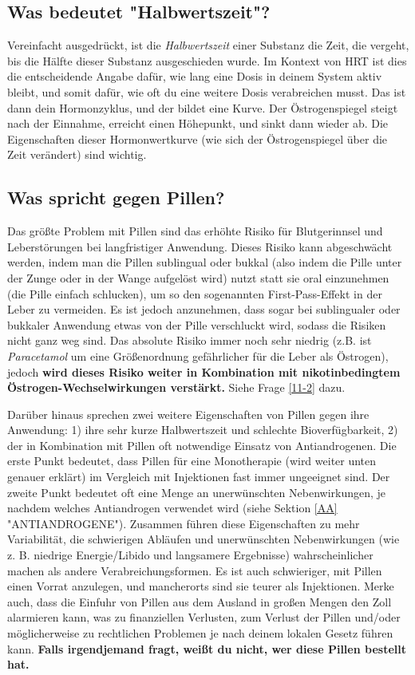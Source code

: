 \documentclass{article}
\begin{document}
\subsection{Was bedeutet "Halbwertszeit"?}

Vereinfacht ausgedrückt, ist die \textit{Halbwertszeit} einer Substanz die Zeit, die vergeht, bis die Hälfte dieser Substanz ausgeschieden wurde. Im Kontext von HRT ist dies die entscheidende Angabe dafür, wie lang eine Dosis in deinem System aktiv bleibt, und somit dafür, wie oft du eine weitere Dosis verabreichen musst. Das ist dann dein Hormonzyklus, und der bildet eine Kurve. Der Östrogenspiegel steigt nach der Einnahme, erreicht einen Höhepunkt, und sinkt dann wieder ab. Die Eigenschaften dieser Hormonwertkurve (wie sich der Östrogenspiegel über die Zeit verändert) sind wichtig.

\subsection{Was spricht gegen Pillen?}

Das größte Problem mit Pillen sind das erhöhte Risiko für Blutgerinnsel und Leberstörungen bei langfristiger Anwendung. Dieses Risiko kann abgeschwächt werden, indem man die Pillen sublingual oder bukkal (also indem die Pille unter der Zunge oder in der Wange aufgelöst wird) nutzt statt sie oral einzunehmen (die Pille einfach schlucken), um so den sogenannten First-Pass-Effekt in der Leber zu vermeiden. Es ist jedoch anzunehmen, dass sogar bei sublingualer oder bukkaler Anwendung etwas von der Pille verschluckt wird, sodass die Risiken nicht ganz weg sind. Das absolute Risiko immer noch sehr niedrig (z.B. ist \textit{Paracetamol} um eine Größenordnung gefährlicher für die Leber als Östrogen), jedoch \textbf{wird dieses Risiko weiter in Kombination mit nikotinbedingtem Östrogen-Wechselwirkungen verstärkt.} Siehe Frage \ref{11-2} dazu.

Darüber hinaus sprechen zwei weitere Eigenschaften von Pillen gegen ihre Anwendung: 1) ihre sehr kurze Halbwertszeit und schlechte Bioverfügbarkeit, 2) der in Kombination mit Pillen oft notwendige Einsatz von Antiandrogenen. Die erste Punkt bedeutet, dass Pillen für eine Monotherapie (wird weiter unten genauer erklärt) im Vergleich mit Injektionen fast immer ungeeignet sind. Der zweite Punkt bedeutet oft eine Menge an unerwünschten Nebenwirkungen, je nachdem welches Antiandrogen verwendet wird (siehe Sektion \ref{AA} "ANTIANDROGENE"). Zusammen führen diese Eigenschaften zu mehr Variabilität, die schwierigen Abläufen und unerwünschten Nebenwirkungen (wie z. B. niedrige Energie/Libido und langsamere Ergebnisse) wahrscheinlicher machen als andere Verabreichungsformen. Es ist auch schwieriger, mit Pillen einen Vorrat anzulegen, und mancherorts sind sie teurer als Injektionen. Merke auch, dass die Einfuhr von Pillen aus dem Ausland in großen Mengen den Zoll alarmieren kann, was zu finanziellen Verlusten, zum Verlust der Pillen und/oder möglicherweise zu rechtlichen Problemen je nach deinem lokalen Gesetz führen kann. \textbf{Falls irgendjemand fragt, weißt du nicht, wer diese Pillen bestellt hat.}
\end{document}
